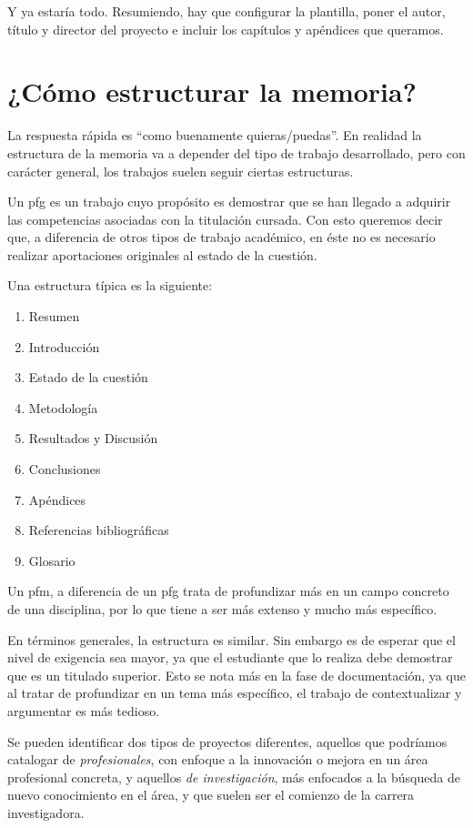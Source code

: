 Y ya estaría todo. Resumiendo, hay que configurar la plantilla, poner el autor, título y director del proyecto e incluir los capítulos y apéndices que queramos.

\section{¿Cómo estructurar la memoria?}
\label{s:como-estructurar}

La respuesta rápida es \enquote{como buenamente quieras/puedas}. En realidad la estructura de la memoria va a depender del tipo de trabajo desarrollado, pero con carácter general, los trabajos suelen seguir ciertas estructuras.

Un \gls{pfg} es un trabajo cuyo propósito es demostrar que se han llegado a adquirir las competencias asociadas con la titulación cursada. Con esto queremos decir que, a diferencia de otros tipos de trabajo académico, en éste no es necesario realizar aportaciones originales al estado de la cuestión.

Una estructura típica es la siguiente:

\begin{enumerate}
    \item Resumen
    \item Introducción
    \item Estado de la cuestión
    \item Metodología
    \item Resultados y Discusión
    \item Conclusiones
    \item Apéndices
    \item Referencias bibliográficas
    \item Glosario
\end{enumerate}

Un \gls{pfm}, a diferencia de un \gls{pfg} trata de profundizar más en un campo concreto de una disciplina, por lo que tiene a ser más extenso y mucho más específico.

En términos generales, la estructura es similar. Sin embargo es de esperar que el nivel de exigencia sea mayor, ya que el estudiante que lo realiza debe demostrar que es un titulado superior. Esto se nota más en la fase de documentación, ya que al tratar de profundizar en un tema más específico, el trabajo de contextualizar y argumentar es más tedioso.

Se pueden identificar dos tipos de proyectos diferentes, aquellos que podríamos catalogar de \textit{profesionales}, con enfoque a la innovación o mejora en un área profesional concreta, y aquellos \textit{de investigación}, más enfocados a la búsqueda de nuevo conocimiento en el área, y que suelen ser el comienzo de la carrera investigadora.
